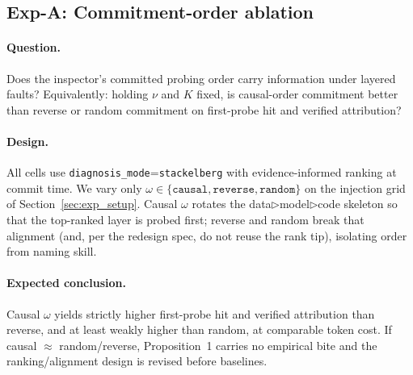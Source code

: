 \documentclass[a4paper,fleqn]{cas-sc}
\newcommand{\tri}{\triangleright}
\begin{document}
\subsection{Exp-A: Commitment-order ablation}
\label{sec:exp_ablation}
\label{sec:exp_i}

\paragraph{Question.}
Does the inspector's committed probing order carry information under layered
faults? Equivalently: holding $\nu$ and $K$ fixed, is causal-order commitment
better than reverse or random commitment on first-probe hit and verified
attribution?

\paragraph{Design.}
All cells use \texttt{diagnosis\_mode}=\texttt{stackelberg} with evidence-informed
ranking at commit time. We vary only
$\omega\in\{\texttt{causal},\texttt{reverse},\texttt{random}\}$ on the
injection grid of Section~\ref{sec:exp_setup}. Causal $\omega$ rotates the
data$\tri$model$\tri$code skeleton so that the top-ranked layer is probed
first; reverse and random break that alignment (and, per the redesign spec,
do not reuse the rank tip), isolating order from naming skill.

\paragraph{Expected conclusion.}
Causal $\omega$ yields strictly higher first-probe hit and verified
attribution than reverse, and at least weakly higher than random, at
comparable token cost. If causal $\approx$ random/reverse,
Proposition~1 carries no empirical bite and the ranking/alignment design
is revised before baselines.
\end{document}
